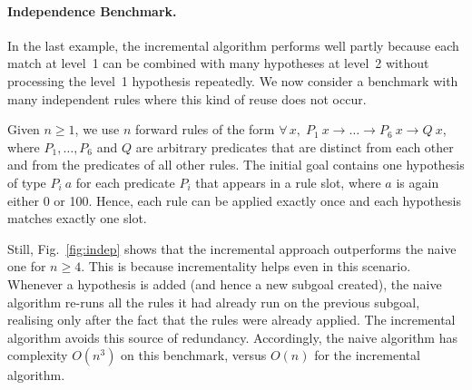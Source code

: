 \documentclass[runningheads]{llncs}
\newcommand{\All}[2]{\ensuremath{\forall\, #1,\; #2}}
\begin{document}
\paragraph{Independence Benchmark.}
In the last example, the incremental algorithm performs well partly because each match at level~1 can be combined with many hypotheses at level~2 without processing the level~1 hypothesis repeatedly.
We now consider a benchmark with many independent rules where this kind of reuse does not occur.

Given $n ≥ 1$, we use $n$ forward rules of the form $\All{x}{P_{1}~x → \dots → P_{6}~x → Q~x}$, where $P_{1}, \dots, P_{6}$ and $Q$ are arbitrary predicates that are distinct from each other and from the predicates of all other rules.
The initial goal contains one hypothesis of type $P_{i}~a$ for each predicate $P_{i}$ that appears in a rule slot, where $a$ is again either 0 or 100.
Hence, each rule can be applied exactly once and each hypothesis matches exactly one slot.

Still, Fig.~\ref{fig:indep} shows that the incremental approach outperforms the naive one for $n ≥ 4$.
This is because incrementality helps even in this scenario.
Whenever a hypothesis is added (and hence a new subgoal created), the naive algorithm re-runs all the rules it had already run on the previous subgoal, realising only after the fact that the rules were already applied.
The incremental algorithm avoids this source of redundancy.
Accordingly, the naive algorithm has complexity $O(n^{3})$ on this benchmark, versus $O(n)$ for the incremental algorithm.
\end{document}
